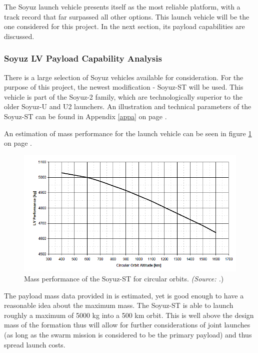 The Soyuz launch vehicle presents itself as the most reliable platform, with a track record that far surpassed all other options. This launch vehicle will be the one considered for this project. In the next section, its payload capabilities are discussed.

\subsubsection{Soyuz LV Payload Capability Analysis}
\label{frLVPCA}

There is a large selection of Soyuz vehicles available for consideration. For the purpose of this project, the newest modification - Soyuz-ST will be used. This vehicle is part of the Soyuz-2 family, which are technologically superior to the older Soyuz-U and U2 launchers. An illustration and technical parameters of the Soyuz-ST can be found in Appendix \ref{appa} on page \pageref{appa} \cite{soyuzman}.

An estimation of mass performance for the launch vehicle can be seen in figure \ref{fig:massperformance} on page \pageref{fig:massperformance}.

\begin{figure}[ht]
\centering
\includegraphics[width=1.0\textwidth, angle=0]{chapters/img/lvmass.png}
\caption{Mass performance of the Soyuz-ST for circular orbits. \emph{(Source: \cite{soyuzman}.})}
\label{fig:massperformance}
\end{figure}

The payload mass data provided in \cite{soyuzman} is estimated, yet is good enough to have a reasonable idea about the maximum mass. The Soyuz-ST is able to launch roughly a maximum of 5000 kg into a 500 km orbit. This is well above the design mass of the formation thus will allow for further considerations of joint launches (as long as the swarm mission is considered to be the primary payload) and thus spread launch costs. 

